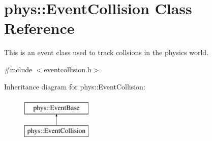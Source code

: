 \hypertarget{classphys_1_1EventCollision}{
\section{phys::EventCollision Class Reference}
\label{dd/de9/classphys_1_1EventCollision}
}


This is an event class used to track collsions in the physics world.  




{\ttfamily \#include $<$eventcollision.h$>$}

Inheritance diagram for phys::EventCollision:\begin{figure}[H]
\begin{center}
\leavevmode
\includegraphics[height=2.000000cm]{dd/de9/classphys_1_1EventCollision}
\end{center}
\end{figure}
